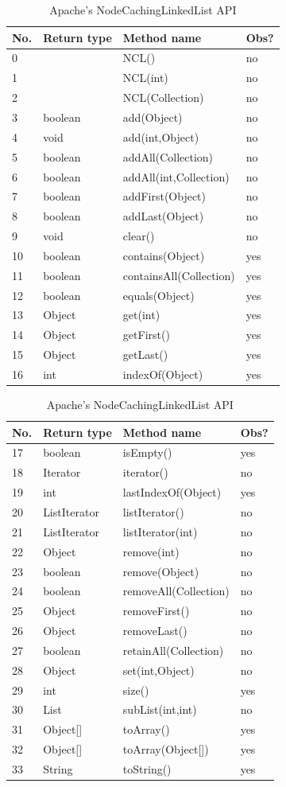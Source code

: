 \begin{table}[t]
\center
{\scriptsize
\begin{tabular}{|l|l|l|l|}
\hline
No. &Return type & Method name & Obs? \\
\hline
    0 && NCL() & no \\
    1& & NCL(int) & no \\
    2&& NCL(Collection) & no \\
    3&boolean & add(Object) & no \\
    4&void&add(int,Object) & no \\
    5&boolean&addAll(Collection) & no\\
    6&boolean&addAll(int,Collection) & no \\
    7&boolean&addFirst(Object) & no \\
    8&boolean&addLast(Object) & no\\
    9&void&clear() & no\\
    10&boolean&contains(Object) & yes \\
    11&boolean&containsAll(Collection) & yes \\
    12&boolean&equals(Object) & yes \\
    13&Object&get(int) & yes\\
    14&Object&getFirst() &yes \\
    15&Object&getLast() & yes\\
    16&int&indexOf(Object) &yes\\
   
\hline 
\end{tabular}
\begin{tabular}{|l|l|l|l|}
\hline
No. &Return type & Method name & Obs? \\
\hline
 	17&boolean&isEmpty() & yes\\
    18&Iterator&iterator() & no\\
    19&int&lastIndexOf(Object) &yes \\
    20&ListIterator&listIterator() &no \\
    21&ListIterator&listIterator(int) & no\\
    22&Object&remove(int) &no\\
    23&boolean&remove(Object) & no \\
    24&boolean&removeAll(Collection) & no \\
    25&Object&removeFirst() &no\\
    26&Object&removeLast() &no\\
    27&boolean&retainAll(Collection) &no \\
    28&Object&set(int,Object) &no\\
    29&int&size() &yes\\
    30&List&subList(int,int) & no \\
    31&Object[]&toArray() & yes \\
    32&Object[]&toArray(Object[]) &yes\\
    33&String&toString() & yes \\
\hline
\end{tabular}
}
\caption{Apache's NodeCachingLinkedList API}
\label{tab:ncl-api}
\end{table} 

